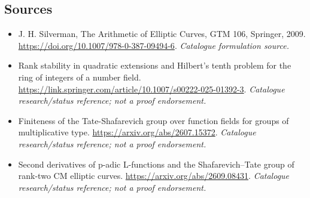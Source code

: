 \documentclass[11pt,a4paper]{article}
\numberwithin{equation}{section}
\begin{document}
\subsection{Sources}
\begin{itemize}\raggedright
\item[\textnormal{[S1]}]\hypertarget{source:59:1}{} J. H. Silverman, The Arithmetic of Elliptic Curves, GTM 106, Springer, 2009.
\url{https://doi.org/10.1007/978-0-387-09494-6}.
{\small\textit{Catalogue formulation source.}}
\item[\textnormal{[S2]}]\hypertarget{source:59:2}{} Rank stability in quadratic extensions and Hilbert’s tenth problem for the ring of integers of a number field.
\url{https://link.springer.com/article/10.1007/s00222-025-01392-3}.
{\small\textit{Catalogue research/status reference; not a proof endorsement.}}
\item[\textnormal{[S3]}]\hypertarget{source:59:3}{} Finiteness of the Tate-Shafarevich group over function fields for groups of multiplicative type.
\url{https://arxiv.org/abs/2607.15372}.
{\small\textit{Catalogue research/status reference; not a proof endorsement.}}
\item[\textnormal{[S4]}]\hypertarget{source:59:4}{} Second derivatives of p-adic L-functions and the Shafarevich–Tate group of rank-two CM elliptic curves.
\url{https://arxiv.org/abs/2609.08431}.
{\small\textit{Catalogue research/status reference; not a proof endorsement.}}


\end{itemize}
\end{document}
